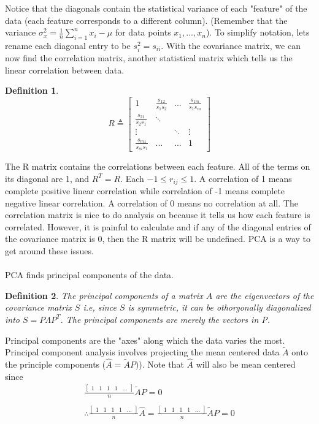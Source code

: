 \documentclass{article}
\newtheorem{definition}{Definition}
\begin{document}
Notice that the diagonals contain the statistical variance of each "feature" of the data (each feature corresponds to a different column).
(Remember that the variance $\sigma_x^2 = \frac{1}{n}\sum_{i=1}^{n}{x_i-\mu}$ for data points $x_1, ..., x_n$).
To simplify notation, lets rename each diagonal entry to be $s_i^2=s_{ii}$.
With the covariance matrix, we can now find the correlation matrix, another statistical matrix which tells us the linear correlation between data.
\begin{definition}
    \[
        R \triangleq \left[
            \begin{array}{cccc}
                1 & \frac{s_{12}}{s_1s_2} & ... & \frac{s_{1m}}{s_1s_m}\\
                \frac{s_{21}}{s_2s_1} & \ddots & &\\
                \vdots & & \ddots & \vdots\\
                \frac{s_{m1}}{s_ms_1} & ... & ... & 1
            \end{array}
        \right]
    \]
\end{definition}
The R matrix contains the correlations between each feature. All of the terms on its diagonal are 1, and $R^T=R$.
Each $-1 \le r_{ij} \le 1$. A correlation of 1 means complete positive linear correlation while correlation of -1 means complete negative linear correlation.
A correlation of 0 means no correlation at all. The correlation matrix is nice to do analysis on because it tells us how each feature is correlated.
However, it is painful to calculate and if any of the diagonal entries of the covariance matrix is 0, then the R matrix will be undefined.
PCA is a way to get around these issues.
\\\\PCA finds principal components of the data.
\begin{definition}
    The principal components of a matrix $A$ are the eigenvectors of the covariance matrix $S$
    i.e, since $S$ is symmetric, it can be othorgonally diagonalized into $S = P\Lambda P^T$.
    The principal components are merely the vectors in P.
\end{definition}
Principal components are the "axes" along which the data varies the most.
Principal component analysis involves projecting the mean centered data $\tilde{A}$ onto the principle components ($\hat{A}=\tilde{A}P)$).
Note that $\hat{A}$ will also be mean centered since
\[
    \begin{array}{c}
        \frac{\left[
        \begin{array}{ccccc}
            1 & 1 & 1 & 1 & ...
        \end{array}
    \right]}{n} \tilde{A}P = 0 \\\\
    \therefore \frac{\left[
        \begin{array}{ccccc}
            1 & 1 & 1 & 1 & ...
        \end{array}
    \right]}{n} \hat{A} = \frac{\left[
        \begin{array}{ccccc}
            1 & 1 & 1 & 1 & ...
        \end{array}
    \right]}{n} \tilde{A}P = 0
    \end{array}
\]
\end{document}
